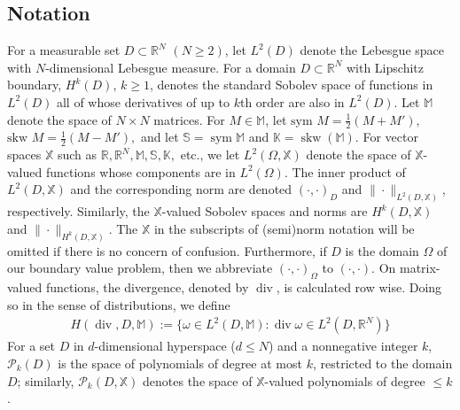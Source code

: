 \documentclass[12pt]{amsart}
\numberwithin{equation}{section}
\theoremstyle{definition}
\theoremstyle{remark}
\newcommand{\R}{\mathbb{R}}
\newcommand{\M}{\mathbb{M}}
\newcommand{\X}{\mathbb{X}}
\newcommand{\SSS}{\mathbb{S}}
\newcommand{\K}{\mathbb{K}}
\newcommand{\om}{{\Omega}}
\renewcommand{\(}{\bigl(}
\renewcommand{\)}{\bigr)}
\renewcommand\div{\operatorname{div}}
\newcommand\sym{\operatorname{sym}}
\newcommand\skw{\operatorname{skw}}
\begin{document}
\subsection{Notation}  \label{ssec:notation}
For a measurable set $D \subset \mathbb{R}^N$ $(N \ge 2)$, let $L^2(D)$ denote the Lebesgue space with $N$-dimensional Lebesgue measure. For a domain $D \subset \mathbb{R}^N$ with Lipschitz boundary, $H^k(D)$, $k \ge 1$, denotes the standard Sobolev space \cite{Evans-book} of functions in  $L^2(D)$ all of whose derivatives
of up to $k$th order are also in $L^2(D)$.
Let $\M$ denote the space of $N\times N$
matrices. For $M \in \M$, let 
$  \text{sym } M= \frac{1}{2}(M+M'),$
  $  \text{skw } M= \frac{1}{2}(M-M'),$
and  let $\SSS = \sym \M$ and  $\K = \skw(\M)$.
For   vector spaces $\mathbb{X}$ such as  $ \R, \R^N, \M, \SSS, \K,$ etc.,
we let $L^2(\Omega, \mathbb{X})$ denote the space of $\mathbb{X}$-valued functions whose components are in $L^2(\Omega)$. The inner product of $L^2(D, \mathbb{X})$ and the corresponding norm are denoted $(\cdot, \cdot)_D$ and $\| \cdot \|_{L^2(D, \X)}$, respectively.
Similarly, the $\mathbb{X}$-valued Sobolev spaces and norms are $H^k(D, \mathbb{X})$ and $\| \cdot \|_{H^k(D,\mathbb{X})}$. The $\X$ in the subscripts of  (semi)norm notation will be omitted  if there is no concern of confusion.
Furthermore, if $D$ is  the domain $\Omega$ of  our boundary value problem, then we abbreviate  $(\cdot, \cdot)_\om$ to $(\cdot, \cdot)$. On matrix-valued functions, the divergence, denoted by $\div$, is calculated row wise. Doing so in the sense of distributions, we define 
\begin{align*}
    H(\div,D,\M):=\{ \omega \in L^2(D, \M): \div \omega \in L^2(D, \R^N) \}
\end{align*}
For a set $D$ in $d$-dimensional hyperspace ($d \le N$) and a nonnegative integer $k$, $\mathcal{P}_k(D)$ is the space of polynomials of degree at most $k$, restricted to the domain $D$; similarly, $\mathcal{P}_k(D,\mathbb{X})$ denotes the space of $\mathbb{X}$-valued polynomials of degree $\le k$. 
\end{document}
